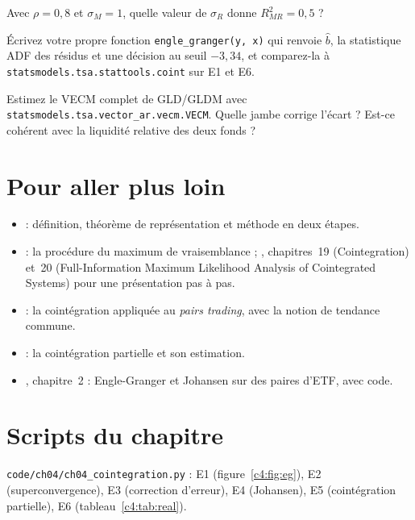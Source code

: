 \begin{exercise}
Avec $\rho = 0{,}8$ et $\sigma_M = 1$, quelle valeur de $\sigma_R$ donne $R^2_{MR} = 0{,}5$ ?
\end{exercise}

\begin{exercise}[à coder]
Écrivez votre propre fonction \texttt{engle\_granger(y, x)} qui renvoie $\hat b$, la statistique ADF des résidus et une décision au seuil $-3{,}34$, et comparez-la à \texttt{statsmodels.tsa.stattools.coint} sur E1 et E6.
\end{exercise}

\begin{exercise}[à coder]
Estimez le VECM complet de GLD/GLDM avec \texttt{statsmodels.tsa.vector\_ar.vecm.VECM}. Quelle jambe corrige l'écart ? Est-ce cohérent avec la liquidité relative des deux fonds ?
\end{exercise}

\section{Pour aller plus loin}

\begin{toread}
\begin{itemize}[leftmargin=1.2em]
\item \citet{englegranger1987} : définition, théorème de représentation et méthode en deux étapes.
\item \citet{johansen1991} : la procédure du maximum de vraisemblance ; \citet{hamilton1994}, chapitres~19 (\og Cointegration\fg) et~20 (\og Full-Information Maximum Likelihood Analysis of Cointegrated Systems\fg) pour une présentation pas à pas.
\item \citet{vidyamurthy2004} : la cointégration appliquée au \emph{pairs trading}, avec la notion de tendance commune.
\item \citet{clegg2018} : la cointégration partielle et son estimation.
\item \citet{chan2013}, chapitre~2 : Engle-Granger et Johansen sur des paires d'ETF, avec code.
\end{itemize}
\end{toread}

\section{Scripts du chapitre}
\noindent\texttt{code/ch04/ch04\_cointegration.py} : E1 (figure~\ref{c4:fig:eg}), E2 (superconvergence), E3 (correction d'erreur), E4 (Johansen), E5 (cointégration partielle), E6 (tableau~\ref{c4:tab:real}).
